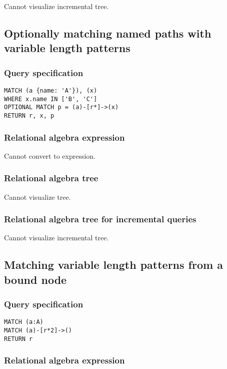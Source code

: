 Cannot visualize incremental tree.

\subsection{Optionally matching named paths with variable length patterns}

\subsubsection*{Query specification}

\begin{lstlisting}
MATCH (a {name: 'A'}), (x)
WHERE x.name IN ['B', 'C']
OPTIONAL MATCH p = (a)-[r*]->(x)
RETURN r, x, p
\end{lstlisting}

\subsubsection*{Relational algebra expression}

Cannot convert to expression.

\subsubsection*{Relational algebra tree}

Cannot visualize tree.

\subsubsection*{Relational algebra tree for incremental queries}

Cannot visualize incremental tree.

\subsection{Matching variable length patterns from a bound node}

\subsubsection*{Query specification}

\begin{lstlisting}
MATCH (a:A)
MATCH (a)-[r*2]->()
RETURN r
\end{lstlisting}

\subsubsection*{Relational algebra expression}

